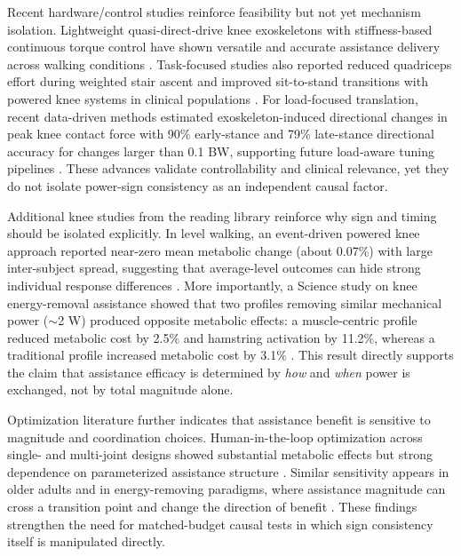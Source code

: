 \documentclass[lettersize,journal]{IEEEtran}
\begin{document}
Recent hardware/control studies reinforce feasibility but not yet mechanism isolation. Lightweight quasi-direct-drive knee exoskeletons with stiffness-based continuous torque control have shown versatile and accurate assistance delivery across walking conditions \cite{huang2022stiffness}. Task-focused studies also reported reduced quadriceps effort during weighted stair ascent and improved sit-to-stand transitions with powered knee systems in clinical populations \cite{boon2025stairs,gunnell2025sts}. For load-focused translation, recent data-driven methods estimated exoskeleton-induced directional changes in peak knee contact force with 90\% early-stance and 79\% late-stance directional accuracy for changes larger than 0.1 BW, supporting future load-aware tuning pipelines \cite{miller2025kcf}. These advances validate controllability and clinical relevance, yet they do not isolate power-sign consistency as an independent causal factor.

Additional knee studies from the reading library reinforce why sign and timing should be isolated explicitly. In level walking, an event-driven powered knee approach reported near-zero mean metabolic change (about 0.07\%) with large inter-subject spread, suggesting that average-level outcomes can hide strong individual response differences \cite{jang2019assistance}. More importantly, a Science study on knee energy-removal assistance showed that two profiles removing similar mechanical power ($\sim$2 W) produced opposite metabolic effects: a muscle-centric profile reduced metabolic cost by 2.5\% and hamstring activation by 11.2\%, whereas a traditional profile increased metabolic cost by 3.1\% \cite{shepertycky2021removing}. This result directly supports the claim that assistance efficacy is determined by \emph{how} and \emph{when} power is exchanged, not by total magnitude alone.

Optimization literature further indicates that assistance benefit is sensitive to magnitude and coordination choices. Human-in-the-loop optimization across single- and multi-joint designs showed substantial metabolic effects but strong dependence on parameterized assistance structure \cite{franks2021compare,bryan2021optimized}. Similar sensitivity appears in older adults and in energy-removing paradigms, where assistance magnitude can cross a transition point and change the direction of benefit \cite{lakmazaheri2024older,shepertycky2023transition}. These findings strengthen the need for matched-budget causal tests in which sign consistency itself is manipulated directly.
\end{document}
